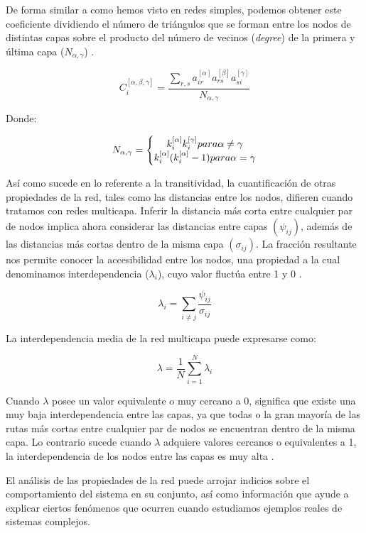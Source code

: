 \documentclass[
]{book}
\begin{document}
De forma similar a como hemos visto en redes simples, podemos obtener este coeficiente dividiendo el número de triángulos que se forman entre los nodos de distintas capas sobre el producto del número de vecinos (\emph{degree}) de la primera y última capa (\(N_{\alpha, \gamma}\)) \citep{cozzo2013clustering}.

\[C_{i}^{[\alpha,\beta,\gamma]}=\frac{\sum_{r,s}a^{[\alpha]}_{ir}a^{[\beta]}_{rs}a^{[\gamma]}_{si}}{N_{\alpha, \gamma}}\]

Donde:

\[N_{\alpha, \gamma} = \left\{\begin{matrix}
k^{[\alpha]}_{i}k^{[\gamma]}_{i} \space para \space  \alpha \neq \gamma \\
k^{[\alpha]}_{i}(k^{[\alpha]}_{i}-1) \space para \space  \alpha = \gamma
\end{matrix}\right. \]

Así como sucede en lo referente a la transitividad, la cuantificación de otras propiedades de la red, tales como las distancias entre los nodos, difieren cuando tratamos con redes multicapa. Inferir la distancia más corta entre cualquier par de nodos implica ahora considerar las distancias entre capas \((\psi_{ij})\), además de las distancias más cortas dentro de la misma capa \((\sigma_{ij})\). La fracción resultante nos permite conocer la accesibilidad entre los nodos, una propiedad a la cual denominamos interdependencia (\(\lambda_{i}\)), cuyo valor fluctúa entre 1 y 0 \citep{donges2011investigating}.

\[\lambda_{i} = \sum_{i \neq j}\frac{\psi_{ij}}{\sigma_{ij}}\]

La interdependencia media de la red multicapa puede expresarse como:

\[\lambda = \frac{1}{N}\sum_{i=1}^{N}\lambda_{i}\]

Cuando \(\lambda\) posee un valor equivalente o muy cercano a 0, significa que existe una muy baja interdependencia entre las capas, ya que todas o la gran mayoría de las rutas más cortas entre cualquier par de nodos se encuentran dentro de la misma capa. Lo contrario sucede cuando \(\lambda\) adquiere valores cercanos o equivalentes a 1, la interdependencia de los nodos entre las capas es muy alta \citep{donges2011investigating}.

El análisis de las propiedades de la red puede arrojar indicios sobre el comportamiento del sistema en su conjunto, así como información que ayude a explicar ciertos fenómenos que ocurren cuando estudiamos ejemplos reales de sistemas complejos.
\end{document}
